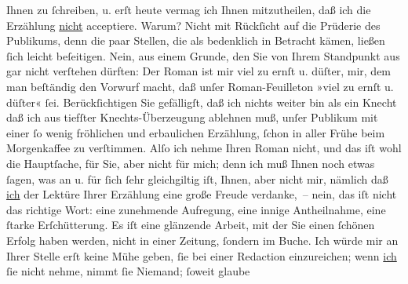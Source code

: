 \begin{ledgroupsized}[t]{13cm}
               Ihnen zu ſchreiben, u. erſt heute vermag ich Ihnen mitzutheilen, daß ich die
               Erzählung \uline{nicht} acceptiere.\pend
           \pstart
           Warum? Nicht mit Rückſicht auf die Prüderie des Publikums, denn die paar Stellen, die
               als bedenklich in Betracht kämen, ließen ſich leicht beſeitigen. Nein, aus einem
               Grunde, den Sie von Ihrem Standpunkt aus gar nicht verſtehen dürften: Der Roman ist mir viel zu ernſt u.
               düſter, mir, dem man beſtändig den Vorwurf macht, daß unſer Roman-Feuilleton »viel zu
               ernſt u. düſter« ſei. Berückſichtigen Sie gefälligſt, daß ich nichts weiter bin als
               ein Knecht \label{T_L00186-1v}\label{T_L00186-1h} daß ich aus
               tiefſter Knechts-Überzeugung ablehnen muß, unſer Publikum mit einer ſo wenig
               fröhlichen und erbaulichen Erzählung, ſchon in aller Frühe beim Morgenkaffee zu
               verſtimmen.\pend
           \pstart
           Alſo ich nehme Ihren Roman
               nicht, und das iſt wohl die Hauptſache, für Sie, aber nicht für mich; denn ich muß
               Ihnen noch etwas ſagen, was an u. für ſich ſehr gleichgiltig iſt, Ihnen, aber nicht
               mir, nämlich daß {\pb}\uline{ich} der Lektüre Ihrer Erzählung eine große Freude verdanke, – nein, das iſt
                   nicht das richtige Wort: eine zunehmende Aufregung, eine innige
               Antheilnahme, eine ſtarke Erſchütterung. Es iſt eine glänzende Arbeit, mit der Sie
               einen ſchönen Erfolg haben werden, nicht in einer Zeitung, ſondern im Buche. Ich
               würde mir an Ihrer Stelle erſt keine Mühe geben, ſie bei einer Redaction
               einzureichen; wenn \uline{ich}{ }ſie nicht nehme, nimmt ſie Niemand; ſoweit glaube

\end{ledgroupsized}
